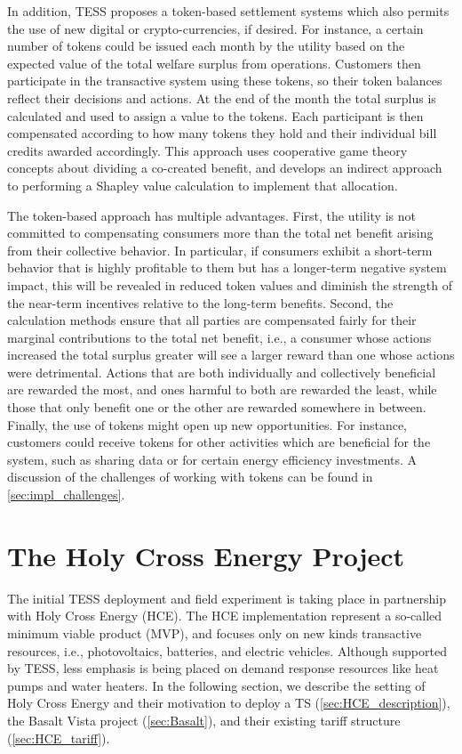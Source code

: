 \documentclass[12pt]{article}{Definitions/mdpi}
\begin{document}
In addition, TESS proposes a token-based settlement systems which also permits the use of new digital or crypto-currencies, if desired.
For instance, a certain number of tokens could be issued each month by the utility based on the expected value of the total welfare surplus from operations. Customers then participate in the transactive system using these tokens, so their token balances reflect their decisions and actions. At the end of the month the total surplus is calculated and used to assign a value to the tokens. Each participant is then compensated according to how many tokens they hold and their individual bill credits awarded accordingly. This approach uses cooperative game theory concepts about dividing a co-created benefit, and develops an indirect approach to performing a Shapley value calculation to implement that allocation.

The token-based approach has multiple advantages. 
First, the utility is not committed to compensating consumers more than the total net benefit arising from their collective behavior. In particular, if consumers exhibit a short-term behavior that is highly profitable to them but has a longer-term negative system impact, this will be revealed in reduced token values and diminish the strength of the near-term incentives relative to the long-term benefits.  
Second, the calculation methods ensure that all parties are compensated fairly for their marginal contributions to the total net benefit, i.e., a consumer whose actions increased the total surplus greater will see a larger reward than one whose actions were detrimental. Actions that are both individually and collectively beneficial are rewarded the most, and ones harmful to both are rewarded the least, while those that only benefit one or the other are rewarded somewhere in between.  
Finally, the use of tokens might open up new opportunities. For instance, customers could receive tokens for other activities which are beneficial for the system, such as sharing data or for certain energy efficiency investments.
A discussion of the challenges of working with tokens can be found in \cref{sec:impl_challenges}.


\section{The Holy Cross Energy Project}\label{sec:hce}

The initial TESS deployment and field experiment is taking place in partnership with Holy Cross Energy (HCE). The HCE implementation represent a so-called minimum viable product (MVP), and focuses only on new kinds transactive resources, i.e., photovoltaics, batteries, and electric vehicles.  Although supported by TESS, less emphasis is being placed on demand response resources like heat pumps and water heaters.  
In the following section, we describe the setting of Holy Cross Energy and their motivation to deploy a TS (\cref{sec:HCE_description}), the Basalt Vista project (\cref{sec:Basalt}), and their existing tariff structure (\cref{sec:HCE_tariff}). 
\end{document}
